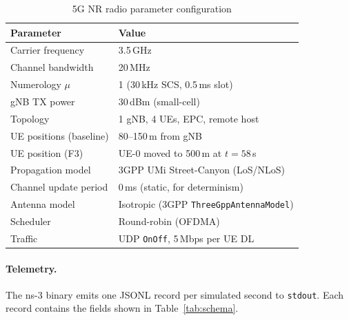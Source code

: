 \documentclass[12pt,a4paper]{article}
\begin{document}
\begin{table}[H]
\centering
\caption{5G NR radio parameter configuration}
\label{tab:radioparam}
\begin{tabular}{ll}
\toprule
\textbf{Parameter} & \textbf{Value} \\
\midrule
Carrier frequency        & 3.5\,GHz \\
Channel bandwidth        & 20\,MHz \\
Numerology $\mu$         & 1 (30\,kHz SCS, 0.5\,ms slot) \\
gNB TX power             & 30\,dBm (small-cell) \\
Topology                 & 1 gNB, 4 UEs, EPC, remote host \\
UE positions (baseline)  & 80--150\,m from gNB \\
UE position (F3)         & UE-0 moved to 500\,m at $t=58$\,s \\
Propagation model        & 3GPP UMi Street-Canyon (LoS/NLoS) \\
Channel update period    & 0\,ms (static, for determinism) \\
Antenna model            & Isotropic (3GPP \texttt{ThreeGppAntennaModel}) \\
Scheduler                & Round-robin (OFDMA) \\
Traffic                  & UDP \texttt{OnOff}, 5\,Mbps per UE DL \\
\bottomrule
\end{tabular}
\end{table}

\paragraph{Telemetry.}
The ns-3 binary emits one JSONL record per simulated second to \texttt{stdout}.
Each record contains the fields shown in Table~\ref{tab:schema}.
\end{document}
